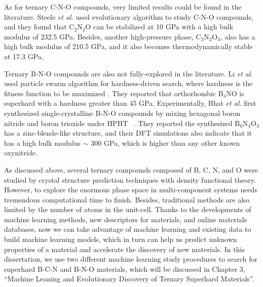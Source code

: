 As for ternary C-N-O compounds, very limited results could be found in the literature. Steele {\it et al.} used evolutionary algorithm to study C-N-O compounds, and they found that C$_2$N$_2$O can be stabilized at 10 GPa \cite{steele2017ternary} with a high bulk modulus of 232.5 GPa. Besides, another high-pressure phase, C$_3$N$_2$O$_3$, also has a high bulk modulus of 210.5 GPa, and it also becomes thermodynamically stable at 17.3 GPa,

Ternary B-N-O compounds are also not fully-explored in the literature. Li {\it et al.} used particle swarm algorithm for hardness-driven search, where hardness is the fitness function to be maximized \cite{li2015superhard}. They reported that orthorhombic B$_3$NO is superhard with a hardness greater than 45 GPa. Experimentally, Bhat {\it et al.} first synthesized single-crystalline B-N-O compounds by mixing hexagonal boron nitride and boron trioxide under HPHT ~\cite{bhat2015high}. They reported the synthesized B$_6$N$_4$O$_3$ has a zinc-blende-like structure, and their DFT simulations also indicate that it has a high bulk modulus $\sim$ 300 GPa, which is higher than any other known oxynitride.

As discussed above, several ternary compounds composed of B, C, N, and O were studied by crystal structure prediction techniques with density functional theory. However, to explore the enormous phase space in multi-component systems needs tremendous computational time to finish. Besides, traditional methods are also limited by the number of atoms in the unit-cell. Thanks to the developments of machine learning methods, new descriptors for materials, and online materials databases, now we can take advantage of machine learning and existing data to build machine learning models, which in turn can help us predict unknown properties of a material and accelerate the discovery of new materials. In this dissertation, we use two different machine learning study procedures to search for superhard B-C-N and B-N-O materials, which will be discussed in Chapter 3, ``Machine Leaning and  Evolutionary   Discovery of Ternary Superhard Materials''.

\pagebreak
























